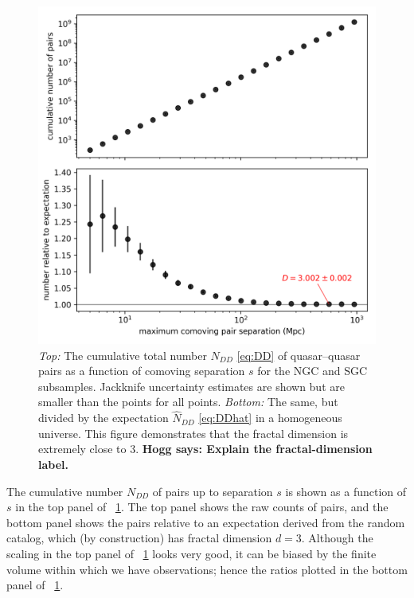 \documentclass[modern]{aastex631}
\newlength{\figurewidth}
\newcommand{\figref}[1]{\figurename~\ref{#1}}
\newcommand{\hogg}[1]{\textbf{Hogg says: #1}}
\begin{document}
\begin{figure}[t!]
  \begin{mdframed}
  \color{captiongray}
  \begin{center}
    \includegraphics[width=\figurewidth]{notebooks/cumulativeDD_DR.png}
  \end{center}
    \caption{\textsl{Top:} The cumulative total number $N_{DD}$ \eqref{eq:DD} of quasar--quasar pairs as a function of comoving separation $s$ for the NGC and SGC subsamples. Jackknife uncertainty estimates are shown but are smaller than the points for all points.
    \textsl{Bottom:} The same, but divided by the expectation $\hat{N}_{DD}$ \eqref{eq:DDhat} in a homogeneous universe.
    This figure demonstrates that the fractal dimension is extremely close to $3$.
    \hogg{Explain the fractal-dimension label.}\label{fig:cumulative}}
  \end{mdframed}
\end{figure}
The cumulative number $N_{DD}$ of pairs up to separation $s$ is shown as a function of $s$ in the top panel of \figref{fig:cumulative}.
The top panel shows the raw counts of pairs, and the bottom panel shows the pairs relative to an expectation derived from the random catalog, which (by construction) has fractal dimension $d=3$.
Although the scaling in the top panel of \figref{fig:cumulative} looks very good, it can be biased by the finite volume within which we have observations; hence the ratios plotted in the bottom panel of \figref{fig:cumulative}.
\end{document}
